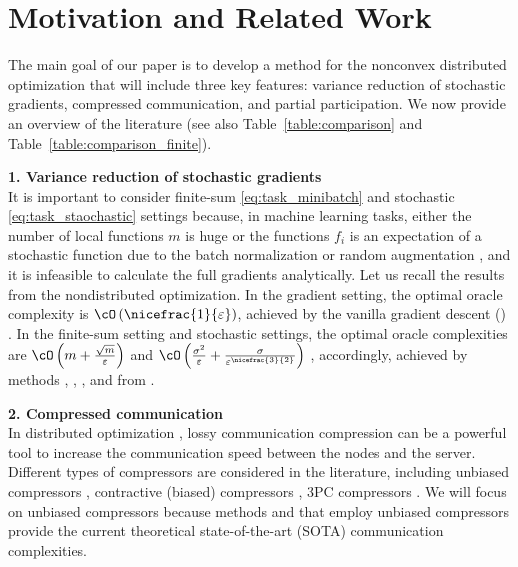 \documentclass{article}
\begin{document}
\section{Motivation and Related Work}
The main goal of our paper is to develop a method for the nonconvex distributed optimization that will include three key features: variance reduction of stochastic gradients, compressed communication, and partial participation. We now provide an overview of the literature (see also Table~\ref{table:comparison} and Table~\ref{table:comparison_finite}).

\textbf{1. Variance reduction of stochastic gradients}\\
It is important to consider finite-sum \eqref{eq:task_minibatch} and stochastic \eqref{eq:task_staochastic} settings because, in machine learning tasks, either the number of local functions $m$ is huge or the functions $f_i$ is an expectation of a stochastic function due to the batch normalization \citep{ioffe2015batch} or random augmentation \citep{goodfellow2016deep}, and it is infeasible to calculate the full gradients analytically. Let us recall the results from the nondistributed optimization. In the gradient setting, the optimal oracle complexity is $\cO\left(\nicefrac{1}{\varepsilon}\right)$, achieved by the vanilla gradient descent () \citep{carmon2020lower, nesterov2018lectures}. In the finite-sum setting and stochastic settings, the optimal oracle complexities are $\cO\left(m + \frac{\sqrt{m}}{\varepsilon}\right)$ and $\cO\left(\frac{\sigma^2}{\varepsilon} + \frac{\sigma}{\varepsilon^{\nicefrac{3}{2}}}\right)$ \citep{SPIDER, PAGE, arjevani2019lower}, accordingly, achieved by methods , , , and  from \citep{SPIDER,SARAH,PAGE,cutkosky2019momentum}.

\textbf{2. Compressed communication} \\
In distributed optimization \citep{ramesh2021zero, xu2021grace}, lossy communication compression can be a powerful tool to increase the communication speed between the nodes and the server. Different types of compressors are considered in the literature, including unbiased compressors \citep{alistarh2017qsgd,beznosikov2020biased,szlendak2021permutation}, contractive (biased) compressors \citep{richtarik2021ef21}, 3PC compressors \citep{richtarik20223pc}. We will focus on unbiased compressors because methods  and  \citep{tyurin2022dasha, szlendak2021permutation, MARINA} that employ unbiased compressors provide the current theoretical state-of-the-art (SOTA) communication complexities.
\end{document}
